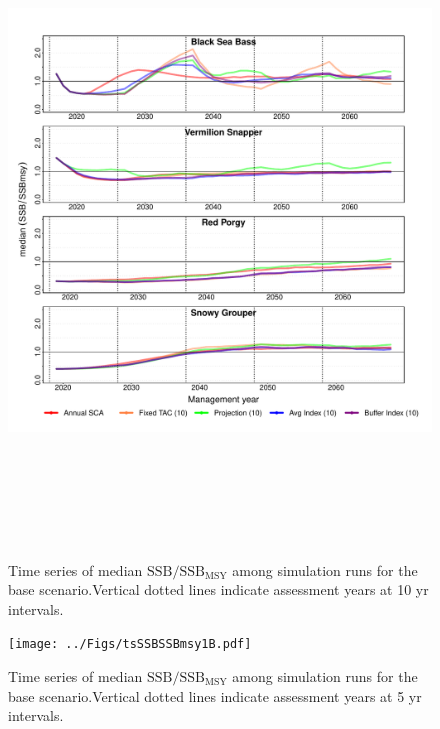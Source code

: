 \documentclass[12pt,english]{article}
\begin{document}
\clearpage\begin{figure}[!ht]
\begin{center}
\includegraphics[width=6in, height=7in]{../Figs/tsSSBSSBmsy1.pdf}
\end{center}
\begin{flushleft}
\caption{Time series of median $\mathrm{SSB/SSB_{MSY}}$ among simulation runs for the base scenario.Vertical dotted lines indicate assessment years at 10 yr intervals.}
\label{fig:tsSSBSSBmsy1}
\end{flushleft}
\end{figure}
\clearpage\begin{figure}[!ht]
\begin{center}
\texttt{[image: ../Figs/tsSSBSSBmsy1B.pdf]}
\end{center}
\begin{flushleft}
\caption{Time series of median $\mathrm{SSB/SSB_{MSY}}$ among simulation runs for the base scenario.Vertical dotted lines indicate assessment years at 5 yr intervals.}
\label{fig:tsSSBSSBmsy1B}
\end{flushleft}
\end{figure}
\clearpage
\end{document}
